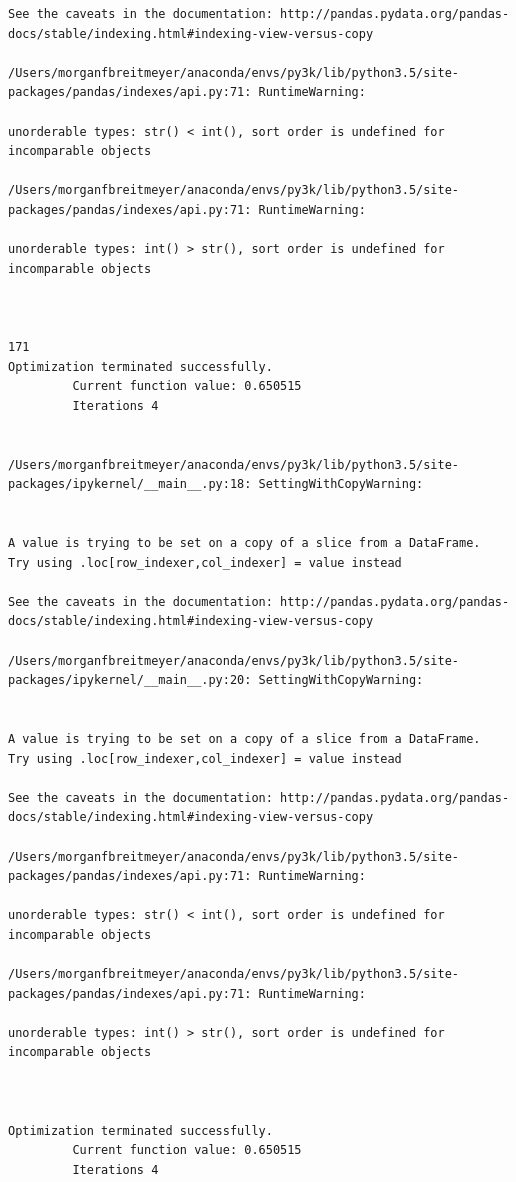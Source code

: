 \begin{lstlisting}
See the caveats in the documentation: http://pandas.pydata.org/pandas-docs/stable/indexing.html#indexing-view-versus-copy

/Users/morganfbreitmeyer/anaconda/envs/py3k/lib/python3.5/site-packages/pandas/indexes/api.py:71: RuntimeWarning:

unorderable types: str() < int(), sort order is undefined for incomparable objects

/Users/morganfbreitmeyer/anaconda/envs/py3k/lib/python3.5/site-packages/pandas/indexes/api.py:71: RuntimeWarning:

unorderable types: int() > str(), sort order is undefined for incomparable objects



171
Optimization terminated successfully.
         Current function value: 0.650515
         Iterations 4


/Users/morganfbreitmeyer/anaconda/envs/py3k/lib/python3.5/site-packages/ipykernel/__main__.py:18: SettingWithCopyWarning:


A value is trying to be set on a copy of a slice from a DataFrame.
Try using .loc[row_indexer,col_indexer] = value instead

See the caveats in the documentation: http://pandas.pydata.org/pandas-docs/stable/indexing.html#indexing-view-versus-copy

/Users/morganfbreitmeyer/anaconda/envs/py3k/lib/python3.5/site-packages/ipykernel/__main__.py:20: SettingWithCopyWarning:


A value is trying to be set on a copy of a slice from a DataFrame.
Try using .loc[row_indexer,col_indexer] = value instead

See the caveats in the documentation: http://pandas.pydata.org/pandas-docs/stable/indexing.html#indexing-view-versus-copy

/Users/morganfbreitmeyer/anaconda/envs/py3k/lib/python3.5/site-packages/pandas/indexes/api.py:71: RuntimeWarning:

unorderable types: str() < int(), sort order is undefined for incomparable objects

/Users/morganfbreitmeyer/anaconda/envs/py3k/lib/python3.5/site-packages/pandas/indexes/api.py:71: RuntimeWarning:

unorderable types: int() > str(), sort order is undefined for incomparable objects



Optimization terminated successfully.
         Current function value: 0.650515
         Iterations 4



\end{lstlisting}

